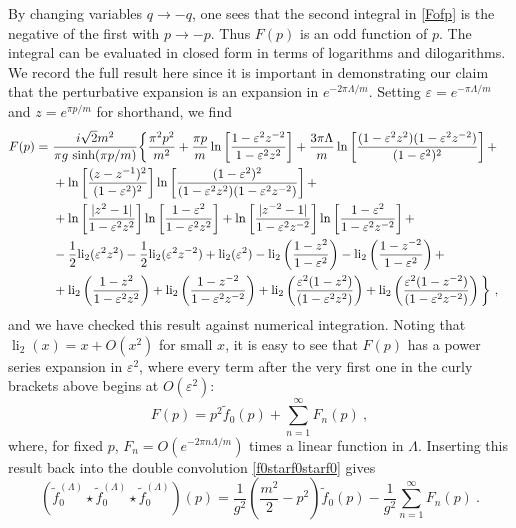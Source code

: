 \def\letter{0}\def\pr{0}\documentclass[a4paper,12pt, epsfig]{article}
\def\litwo{{\operatorname{li}_2}}
\renewcommand{\sinh}{\textrm{sinh}}
\renewcommand{\(}{\begin{equation}}
\renewcommand{\)}{end{equation} \vspace{-.05in}\linebreak}
\renewcommand{\=}{\hspace{-.03in}=\hspace{-.02in}}
\renewcommand{\(}{\begin{equation}}
\renewcommand{\)}{\end{equation}}
\renewcommand{\(}{\begin{equation}}
\renewcommand{\)}{\end{equation}}
\begin{document}
By changing variables $q \to -q$, one sees that the second integral in \eqref{Fofp} is the negative of the first with $p \to -p$.  Thus $F(p)$ is an odd function of $p$.  The integral can be evaluated in closed form in terms of logarithms and dilogarithms.  We record the full result here since it is important in demonstrating our claim that the perturbative expansion is an expansion in $e^{-2\pi \Lambda/m}$.  Setting $\varepsilon = e^{-\pi \Lambda/m}$ and $z = e^{\pi p/m}$ for shorthand, we find
%
\begin{align}
F(p) =&~  \frac{i \sqrt{2} m^2}{\pi g ~ \sinh(\pi p/m)} \bigg\{ \frac{\pi^2 p^2}{m^2} + \frac{\pi p}{m} \ln \left[ \frac{1 - \varepsilon^2 z^{-2}}{1 - \varepsilon^2 z^2} \right] + \frac{3 \pi \Lambda}{m} \ln \left[ \frac{ (1 - \varepsilon^2 z^2)(1 - \varepsilon^2 z^{-2})}{ (1-\varepsilon^2)^2} \right] + \cr
&~ + \ln \left[ \frac{ (z-z^{-1})^2}{(1-\varepsilon^2)^2} \right] \ln \left[ \frac{ (1-\varepsilon^2)^2}{(1-\varepsilon^2 z^2)(1 - \varepsilon^2 z^{-2})} \right] + \cr
&~ + \ln \left[ \frac{| z^2 - 1| }{1 - \varepsilon^2 z^2} \right] \ln \left[ \frac{1- \varepsilon^2}{1 - \varepsilon^2 z^2} \right]  + \ln \left[ \frac{| z^{-2} - 1| }{1 - \varepsilon^2 z^{-2}} \right] \ln \left[ \frac{1- \varepsilon^2}{1 - \varepsilon^2 z^{-2}} \right] + \cr
&~ - \frac{1}{2} \litwo(\varepsilon^2 z^2) - \frac{1}{2} \litwo( \varepsilon^2 z^{-2}) + \litwo(\varepsilon^2) - \litwo\left( \frac{ 1 - z^2}{1 - \varepsilon^2} \right)  - \litwo\left( \frac{ 1 - z^{-2}}{1 - \varepsilon^2} \right) + \cr
&~ + \litwo\left( \frac{1 - z^2}{1 - \varepsilon^2 z^2} \right)  + \litwo\left( \frac{1 - z^{-2}}{1 - \varepsilon^2 z^{-2}} \right) + \litwo \left( \frac{\varepsilon^2 (1- z^2)}{(1- \varepsilon^2 z^2)} \right) + \litwo \left( \frac{\varepsilon^2 (1- z^{-2})}{(1- \varepsilon^2 z^{-2})} \right)  \bigg\} ~,
\end{align}
%
and we have checked this result against numerical integration.  Noting that $\litwo(x) = x + O(x^2)$ for small $x$, it is easy to see that $F(p)$ has a power series expansion in $\varepsilon^2$, where every term after the very first one in the curly brackets above begins at $O(\varepsilon^2)$:
%
\begin{equation}
F(p) = p^2 \tilde{f}_0(p) + \sum_{n=1}^{\infty} F_{n}(p) ~,
\end{equation}
%
where, for fixed $p$, $F_n = O(e^{-2\pi n \Lambda/m})$ times a linear function in $\Lambda$.  Inserting this result back into the double convolution \eqref{f0starf0starf0} gives
%
\begin{equation}
\left(\tilde{f}_{0}^{(\Lambda)} \star \tilde{f}_{0}^{(\Lambda)} \star \tilde{f}_{0}^{(\Lambda)}\right)(p) = \frac{1}{g^2} \left( \frac{m^2}{2} - p^2 \right) \tilde{f}_0(p) - \frac{1}{g^2} \sum_{n=1}^{\infty} F_{n}(p) ~.
\end{equation}
\end{document}
